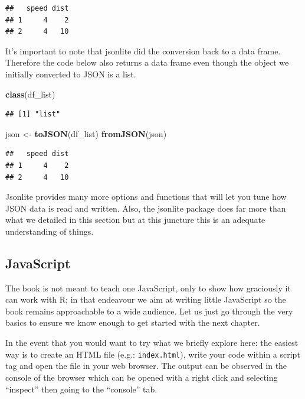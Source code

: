 \documentclass[
]{krantz}
\makeatletter
\newenvironment{Shaded}{\begin{snugshade}}{\end{snugshade}}
\newcommand{\KeywordTok}[1]{\textcolor[rgb]{0.27,0.27,0.27}{\textbf{#1}}}
\newcommand{\NormalTok}[1]{#1}
\newcommand{\StringTok}[1]{\textcolor[rgb]{0.5,0.5,0.5}{#1}}
\newenvironment{kframe}{%
\medskip{}
\setlength{\fboxsep}{.8em}
 \def\at@end@of@kframe{}%
 \ifinner\ifhmode%
  \def\at@end@of@kframe{\end{minipage}}%
  \begin{minipage}{\columnwidth}%
 \fi\fi%
 \def\FrameCommand##1{\hskip\@totalleftmargin \hskip-\fboxsep
 \colorbox{shadecolor}{##1}\hskip-\fboxsep
     \hskip-\linewidth \hskip-\@totalleftmargin \hskip\columnwidth}%
 \MakeFramed {\advance\hsize-\width
   \@totalleftmargin\z@ \linewidth\hsize
   \@setminipage}}%
 {\par\unskip\endMakeFramed%
 \at@end@of@kframe}
\renewenvironment{Shaded}{\begin{kframe}}{\end{kframe}}
\makeatother
\begin{document}
\begin{verbatim}
##   speed dist
## 1     4    2
## 2     4   10
\end{verbatim}

It's important to note that jsonlite did the conversion back to a data frame. Therefore the code below also returns a data frame even though the object we initially converted to JSON is a list.

\begin{Shaded}
\begin{Highlighting}[]
\KeywordTok{class}\NormalTok{(df\_list)}
\end{Highlighting}
\end{Shaded}

\begin{verbatim}
## [1] "list"
\end{verbatim}

\begin{Shaded}
\begin{Highlighting}[]
\NormalTok{json <{-}}\StringTok{ }\KeywordTok{toJSON}\NormalTok{(df\_list)}
\KeywordTok{fromJSON}\NormalTok{(json)}
\end{Highlighting}
\end{Shaded}

\begin{verbatim}
##   speed dist
## 1     4    2
## 2     4   10
\end{verbatim}

Jsonlite provides many more options and functions that will let you tune how JSON data is read and written. Also, the jsonlite package does far more than what we detailed in this section but at this juncture this is an adequate understanding of things.

\hypertarget{javascript}{%
\subsection*{JavaScript}\label{javascript}}


The book is not meant to teach one JavaScript, only to show how graciously it can work with R; in that endeavour we aim at writing little JavaScript so the book remains approachable to a wide audience. Let us just go through the very basics to ensure we know enough to get started with the next chapter.

In the event that you would want to try what we briefly explore here: the easiest way is to create an HTML file (e.g.: \texttt{index.html}), write your code within a script tag and open the file in your web browser. The output can be observed in the console of the browser which can be opened with a right click and selecting ``inspect'' then going to the ``console'' tab.
\end{document}

